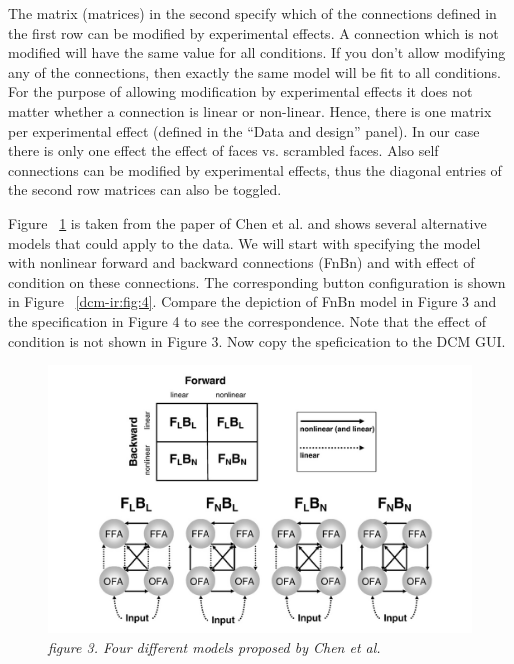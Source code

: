 The matrix (matrices) in the second specify which of the connections defined in the first row can be modified by experimental effects. A connection which is not modified will have the same value for all conditions. If you don't allow modifying any of the connections, then exactly the same model will be fit to all conditions. For the purpose of allowing modification by experimental effects it does not matter whether a connection is linear or non-linear. Hence, there is one matrix per experimental effect (defined in the ``Data and design'' panel). In our case there is only one effect the effect of faces vs. scrambled faces. Also self connections can be modified by experimental effects, thus the diagonal entries of the second row matrices can also be toggled.

Figure ~\ref{dcm-ir:fig:3} is taken from the paper of Chen et al. \cite{cc_asymm} and shows several alternative models that could apply to the data. We will start with specifying the model with nonlinear forward and backward connections (FnBn) and with effect of condition on these connections. The corresponding button configuration is shown in Figure ~\ref{dcm-ir:fig:4}. Compare the depiction of FnBn model in Figure 3 and the specification in Figure 4 to see the correspondence. Note that the effect of condition is not shown in Figure 3. Now copy the speficication to the DCM GUI.

\begin{figure}
\begin{center}
\includegraphics[width=160mm]{dcm_ir/figures/figure3}
\caption{\em  figure 3. Four different models proposed by Chen et al. \cite{cc_asymm} \label{dcm-ir:fig:3}}
\end{center}
\end{figure}

